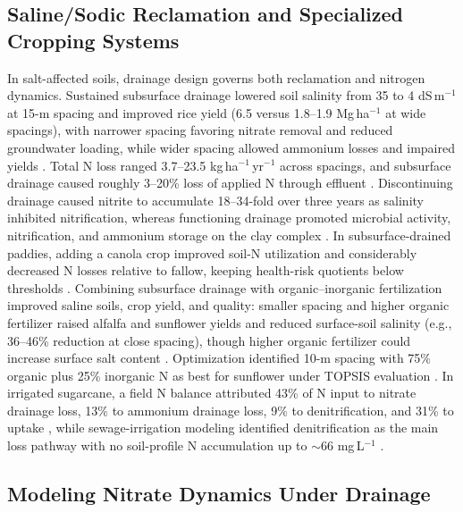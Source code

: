 \documentclass[11pt]{article}
\begin{document}
\subsection{Saline/Sodic Reclamation and Specialized Cropping Systems}

In salt-affected soils, drainage design governs both reclamation and nitrogen dynamics. Sustained subsurface drainage lowered soil salinity from 35 to 4 dS\,m$^{-1}$ at 15-m spacing and improved rice yield (6.5 versus 1.8--1.9 Mg\,ha$^{-1}$ at wide spacings), with narrower spacing favoring nitrate removal and reduced groundwater loading, while wider spacing allowed ammonium losses and impaired yields \parencite{Singh2002,Singh2001c}. Total N loss ranged 3.7--23.5 kg\,ha$^{-1}$\,yr$^{-1}$ across spacings, and subsurface drainage caused roughly 3--20\% loss of applied N through effluent \parencite{Singh2002}. Discontinuing drainage caused nitrite to accumulate 18--34-fold over three years as salinity inhibited nitrification, whereas functioning drainage promoted microbial activity, nitrification, and ammonium storage on the clay complex \parencite{Singh2007}. In subsurface-drained paddies, adding a canola crop improved soil-N utilization and considerably decreased N losses relative to fallow, keeping health-risk quotients below thresholds \parencite{DarziNaftchali2017}. Combining subsurface drainage with organic--inorganic fertilization improved saline soils, crop yield, and quality: smaller spacing and higher organic fertilizer raised alfalfa and sunflower yields and reduced surface-soil salinity (e.g., 36--46\% reduction at close spacing), though higher organic fertilizer could increase surface salt content \parencite{Zhang2024d,Zhai2023}. Optimization identified 10-m spacing with 75\% organic plus 25\% inorganic N as best for sunflower under TOPSIS evaluation \parencite{Zhu2025}. In irrigated sugarcane, a field N balance attributed 43\% of N input to nitrate drainage loss, 13\% to ammonium drainage loss, 9\% to denitrification, and 31\% to uptake \parencite{Matinzadeh2017}, while sewage-irrigation modeling identified denitrification as the main loss pathway with no soil-profile N accumulation up to $\sim$66 mg\,L$^{-1}$ \parencite{Yang2008}.

\subsection{Modeling Nitrate Dynamics Under Drainage}
\end{document}
